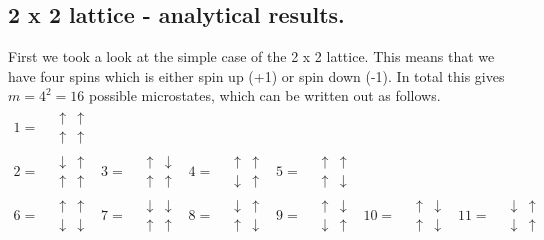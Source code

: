 \documentclass[%
 reprint,
nofootinbib,
aps,
]{revtex4-1}
\begin{document}
\subsection{2 x 2 lattice - analytical results.}\label{sec:analytical}
First we took a look at the simple case of the 2 x 2 lattice. This means that we have four spins which is either spin up (+1) or spin down (-1). In total this gives $m = 4^2= 16$ possible microstates, which can be written out as follows.
\begin{align*}
1=\ &\begin{matrix}\uparrow&\uparrow\\\uparrow&\uparrow \end{matrix}& \\
2=\ &\begin{matrix}\downarrow&\uparrow\\\uparrow&\uparrow \end{matrix}&
3=\ &\begin{matrix}\uparrow&\downarrow\\\uparrow&\uparrow \end{matrix}&
4=\ &\begin{matrix}\uparrow&\uparrow\\\downarrow&\uparrow \end{matrix}&
5=\ &\begin{matrix}\uparrow&\uparrow\\\uparrow&\downarrow \end{matrix}&\\
6=\ &\begin{matrix}\uparrow&\uparrow\\\downarrow&\downarrow \end{matrix}&
7=\ &\begin{matrix}\downarrow&\downarrow\\\uparrow&\uparrow \end{matrix}&
8=\ &\begin{matrix}\downarrow&\uparrow\\\uparrow&\downarrow \end{matrix}&
9=\ &\begin{matrix}\uparrow&\downarrow\\\downarrow&\uparrow \end{matrix}&
10=\ &\begin{matrix}\uparrow&\downarrow\\\uparrow&\downarrow \end{matrix}&
11=\ &\begin{matrix}\downarrow&\uparrow\\\downarrow&\uparrow \end{matrix}&\\

\end{align*}
\end{document}
